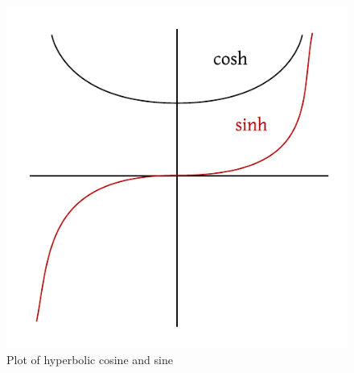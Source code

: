\documentclass[a4paper,landscape,twocolumn]{article}
\theoremstyle{definition}
\begin{document}
\begin{figure}[!h]
  \begin{center}
    \includegraphics{img/sinhcosh.pdf}
    \caption{Plot of hyperbolic cosine and sine}
    \label{img:coshsinh}
  \end{center}
\end{figure}
\end{document}
